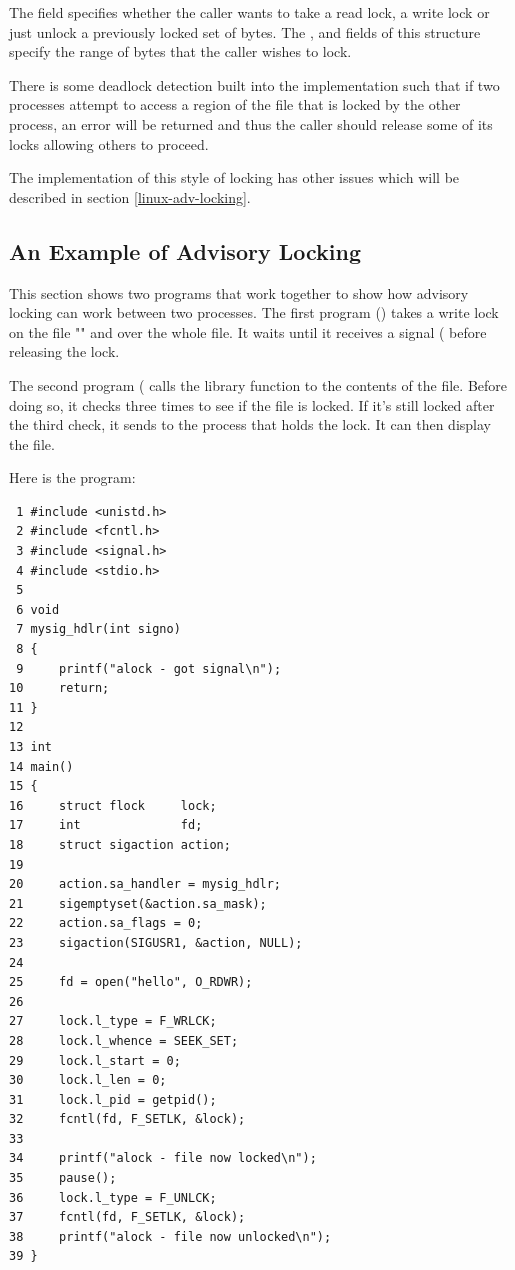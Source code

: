 \noindent
The  field specifies whether the caller wants to take a read lock, a write lock or just unlock a previously locked set of bytes. The ,   and  fields of this structure specify the range of bytes that the caller wishes to lock.

There is some deadlock detection built into the implementation such that if two processes attempt to access a region of the file that is locked by the other process, an  error will be returned and thus the caller should release some of its locks allowing others to proceed.

The implementation of this style of locking has other issues which will be described in section \ref{linux-adv-locking}.


\subsection{An Example of Advisory Locking}

This section shows two programs that work together to show how advisory locking can work between two processes. The first program () takes a write lock on the file "" and over the whole file. It waits until it receives a signal ( before releasing the lock.

The second program ( calls the  library function to  the contents of the file. Before doing so, it checks three times to see if the file is locked. If it's still locked after the third check, it sends  to the process that holds the lock. It can then display the file.

Here is the  program:

\begin{lstlisting}
 1 #include <unistd.h>
 2 #include <fcntl.h>
 3 #include <signal.h>
 4 #include <stdio.h>
 5 
 6 void
 7 mysig_hdlr(int signo)
 8 {
 9     printf("alock - got signal\n");
10     return;
11 }
12 
13 int
14 main()
15 {
16     struct flock     lock;
17     int              fd;
18     struct sigaction action;
19 
20     action.sa_handler = mysig_hdlr;
21     sigemptyset(&action.sa_mask);
22     action.sa_flags = 0;
23     sigaction(SIGUSR1, &action, NULL);
24 
25     fd = open("hello", O_RDWR);
26 
27     lock.l_type = F_WRLCK;
28     lock.l_whence = SEEK_SET;
29     lock.l_start = 0;
30     lock.l_len = 0;
31     lock.l_pid = getpid();
32     fcntl(fd, F_SETLK, &lock);
33     
34     printf("alock - file now locked\n");
35     pause();
36     lock.l_type = F_UNLCK;
37     fcntl(fd, F_SETLK, &lock);
38     printf("alock - file now unlocked\n");
39 }
\end{lstlisting}

